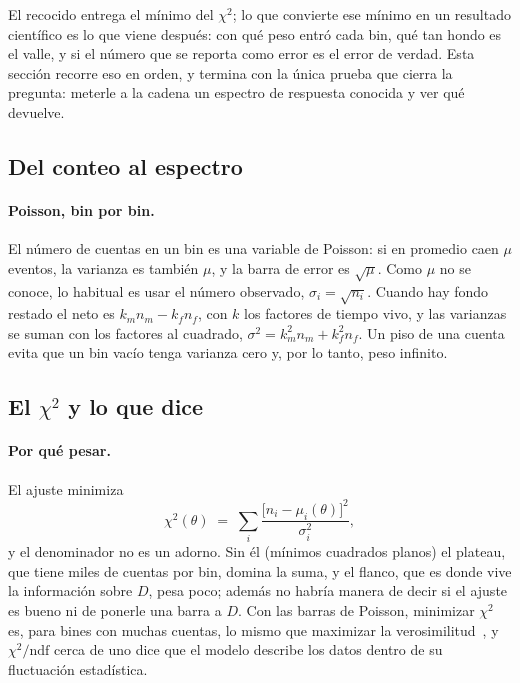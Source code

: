\documentclass[11pt,a4paper]{article}
\begin{document}
El recocido entrega el mínimo del $\chi^2$; lo que convierte ese mínimo en un
resultado científico es lo que viene después: con qué peso entró cada bin,
qué tan hondo es el valle, y si el número que se reporta como error es el
error de verdad. Esta sección recorre eso en orden, y termina con la única
prueba que cierra la pregunta: meterle a la cadena un espectro de respuesta
conocida y ver qué devuelve.

\subsection{Del conteo al espectro}
\label{sec:est-conteo}

\paragraph{Poisson, bin por bin.} El número de cuentas en un bin es una
variable de Poisson: si en promedio caen $\mu$ eventos, la varianza es también
$\mu$, y la barra de error es $\sqrt{\mu}$. Como $\mu$ no se conoce, lo
habitual es usar el número observado, $\sigma_i = \sqrt{n_i}$. Cuando hay
fondo restado el neto es $k_m n_m - k_f n_f$, con $k$ los factores de tiempo
vivo, y las varianzas se suman con los factores al cuadrado,
$\sigma^2 = k_m^2 n_m + k_f^2 n_f$. Un piso de una cuenta evita que un bin
vacío tenga varianza cero y, por lo tanto, peso infinito.

\subsection{El $\chi^2$ y lo que dice}
\label{sec:est-chi2}

\paragraph{Por qué pesar.} El ajuste minimiza
\[
   \chi^2(\theta) \;=\; \sum_i \frac{\big[n_i - \mu_i(\theta)\big]^2}{\sigma_i^2},
\]
y el denominador no es un adorno. Sin él (mínimos cuadrados planos) el
plateau, que tiene miles de cuentas por bin, domina la suma, y el flanco, que
es donde vive la información sobre $D$, pesa poco; además no habría manera de
decir si el ajuste es bueno ni de ponerle una barra a $D$. Con las barras de
Poisson, minimizar $\chi^2$ es, para bines con muchas cuentas, lo mismo que
maximizar la verosimilitud~\cite{cowan1998}, y $\chi^2/\text{ndf}$ cerca de
uno dice que el modelo describe los datos dentro de su fluctuación
estadística.
\end{document}
